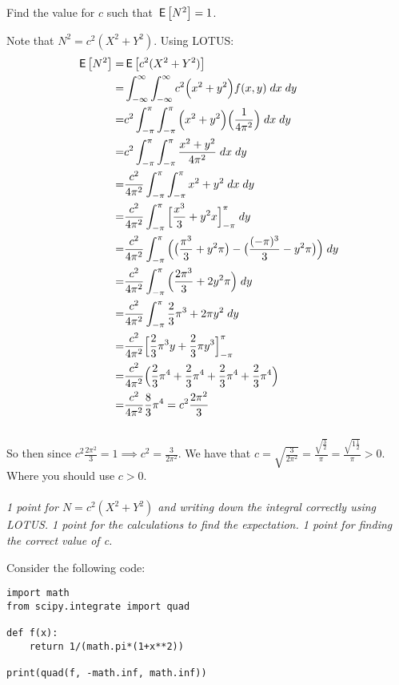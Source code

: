 \begin{exercise}[3]
Find the value for $c$ such that $\,\mathsf{E}\left[N^2\right] = 1$.
\begin{solution}
Note that $N^2 = c^2 (X^2 + Y^2)$. Using LOTUS:
\begin{align*}
    \,\mathsf{E}\left[N^2\right] =& \,\mathsf{E}\left[c^2 (X^2 + Y^2)\right] \\
      =& \int_{-\infty}^\infty \int_{-\infty}^\infty c^2 \Big(x^2 + y^2 \Big) f(x,y) \; dx \; dy\\
      =& c^2 \int_{-\pi}^{\pi} \int_{-\pi}^{\pi}  \Big(x^2 + y^2 \Big) \Big(\frac{1}{4\pi^2} \Big) \; dx \; dy \\
      =& c^2 \int_{-\pi}^{\pi} \int_{-\pi}^{\pi} \frac{x^2 + y^2}{4\pi^2} \; dx \; dy \\
      =& \frac{c^2}{4\pi^2} \int_{-\pi}^{\pi} \int_{-\pi}^{\pi} x^2 + y^2 \; dx \; dy \\
      =& \frac{c^2}{4\pi^2} \int_{-\pi}^{\pi} \Big[\frac{x^3}{3} + y^2x \Big]_{-\pi}^{\pi} \; dy \\
      =& \frac{c^2}{4\pi^2} \int_{-\pi}^{\pi} \Big( \big(\frac{\pi^3}{3} + y^2 \pi \big)- \big(\frac{(-\pi)^3}{3} - y^2 \pi\big ) \Big)\; dy \\
        =& \frac{c^2}{4\pi^2} \int_{-\pi}^{\pi} \Big(\frac{2\pi^3}{3} + 2 y^2\pi \Big)\; dy \\
        =& \frac{c^2}{4\pi^2} \int_{-\pi}^{\pi} \frac{2}{3} \pi^3 + 2\pi y^2 \; dy \\
        =& \frac{c^2}{4\pi^2} \Big[ \frac{2}{3} \pi^3 y + \frac{2}{3} \pi y^3 \Big]_{-\pi}^{\pi}\\
        =& \frac{c^2}{4\pi^2} \Big( \frac{2}{3} \pi^4 + \frac{2}{3} \pi^4 + \frac{2}{3} \pi^4 + \frac{2}{3} \pi^4 \Big) \\
        =& \frac{c^2}{4\pi^2} \frac{8}{3} \pi^4 = c^2 \frac{2\pi^2}{3}
\end{align*} \\
So then since $c^2 \frac{2\pi^2}{3} = 1 \implies c^2 = \frac{3}{2\pi^2}$. We have that $c = \sqrt{\frac{3}{2\pi^2}} = \frac{\sqrt{\frac{3}{2}}}{\pi} = \frac{\sqrt{1 \frac{1}{2}}}{\pi} > 0$. Where you should use $c > 0 $. \\
\\
\textit{1 point for $N = c^2(X^2+Y^2)$ and writing down the integral correctly using LOTUS. 1 point for the calculations to find the expectation. 1 point for finding the correct value of c. }
\end{solution}
\end{exercise}
\noindent
Consider the following code:
\begin{verbatim}
import math
from scipy.integrate import quad

def f(x):
    return 1/(math.pi*(1+x**2))

print(quad(f, -math.inf, math.inf))
\end{verbatim}

